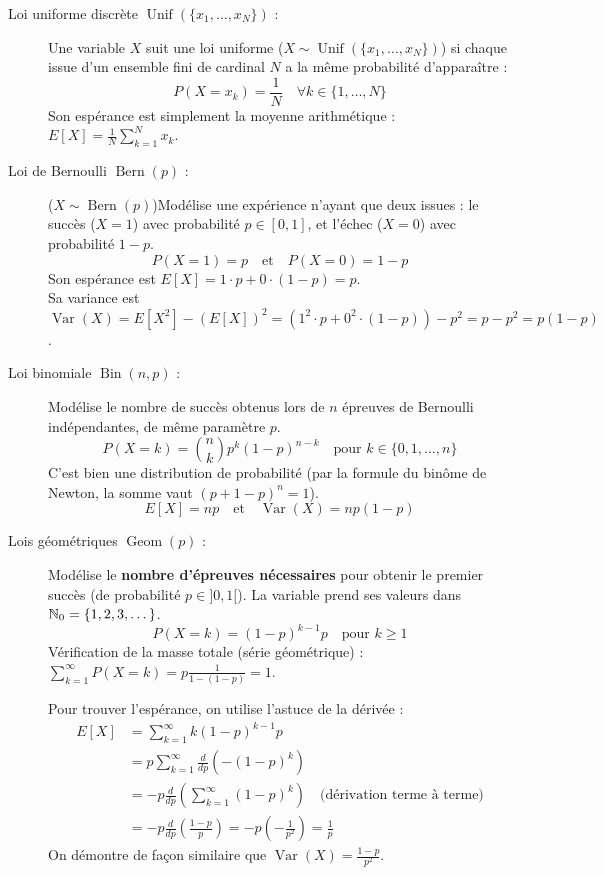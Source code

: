 \begin{description}
    \item[Loi uniforme discrète $\operatorname{Unif}(\{x_1, \dots, x_N\})$ :]
    Une variable $X$ suit une loi uniforme ($X\sim \operatorname{Unif}(\{x_1, \dots, x_N\})$) si chaque issue d'un ensemble fini de cardinal $N$ a la même probabilité d'apparaître :
    \[
    P(X = x_k) = \frac{1}{N} \quad \forall k \in \{1, \dots, N\}
    \]
    Son espérance est simplement la moyenne arithmétique : $E[X] = \frac{1}{N} \sum_{k=1}^N x_k$.

    \item[Loi de Bernoulli $\operatorname{Bern}(p)$ :]
    ($X\sim \operatorname{Bern}(p)$)Modélise une expérience n'ayant que deux issues : le succès ($X=1$) avec probabilité $p \in [0,1]$, et l'échec ($X=0$) avec probabilité $1-p$.
    \[
    P(X=1) = p \quad \text{et} \quad P(X=0) = 1-p
    \]
    Son espérance est $E[X] = 1\cdot p + 0\cdot(1-p) = p$. \\
    Sa variance est $\operatorname{Var}(X) = E[X^2] - (E[X])^2 = (1^2\cdot p + 0^2\cdot(1-p)) - p^2 = p - p^2 = p(1-p)$.

    \item[Loi binomiale $\operatorname{Bin}(n, p)$ :]
    Modélise le nombre de succès obtenus lors de $n$ épreuves de Bernoulli indépendantes, de même paramètre $p$.
    \[
    P(X=k) = \binom{n}{k} p^k (1-p)^{n-k} \quad \text{pour } k \in \{0, 1, \dots, n\}
    \]
    C'est bien une distribution de probabilité (par la formule du binôme de Newton, la somme vaut $(p + 1-p)^n = 1$). 
    \[
    E[X] = np \quad \text{et} \quad \operatorname{Var}(X) = np(1-p)
    \]

    \item[Lois géométriques $\operatorname{Geom}(p)$ :]
    Modélise le \textbf{nombre d'épreuves nécessaires} pour obtenir le premier succès (de probabilité $p \in ]0,1[$). La variable prend ses valeurs dans $\mathbb{N}_0 = \{1, 2, 3, \dots\}$.
    \[
    P(X=k) = (1-p)^{k-1}p \quad \text{pour } k \ge 1
    \]
    Vérification de la masse totale (série géométrique) : $\sum_{k=1}^{\infty} P(X=k) = p \frac{1}{1-(1-p)} = 1$.
    
    Pour trouver l'espérance, on utilise l'astuce de la dérivée :
    \begin{align*}
        E[X] &= \sum_{k=1}^\infty k(1-p)^{k-1}p \\
        &= p \sum_{k=1}^\infty \frac{d}{dp} \left( -(1-p)^k \right) \\
        &= -p \frac{d}{dp} \left( \sum_{k=1}^\infty (1-p)^k \right) \quad \text{(dérivation terme à terme)} \\
        &= -p \frac{d}{dp} \left( \frac{1-p}{p} \right) = -p \left( -\frac{1}{p^2} \right) = \frac{1}{p}
    \end{align*}
    On démontre de façon similaire que $\operatorname{Var}(X) = \frac{1-p}{p^2}$.
    

\end{description}
